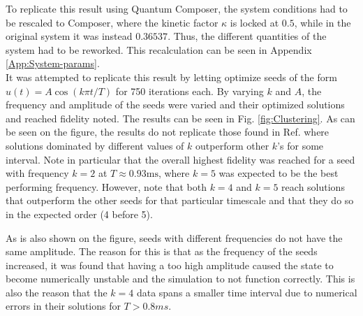 \documentclass[a4paper, twocolumn]{revtex4-1}
\begin{document}
To replicate this result using Quantum Composer, the system conditions had to be rescaled to Composer, where the kinetic factor $\kappa$ is locked at $0.5$, while in the original system it was instead $0.36537$. Thus, the different quantities of the system had to be reworked. This recalculation can be seen in Appendix \ref{App:System-params}. \\
It was attempted to replicate this result by letting  optimize seeds of the form $u(t) = A\cos(k\pi t/T)$ for 750 iterations each. By varying $k$ and $A$, the frequency and amplitude of the seeds were varied and their optimized solutions and reached fidelity noted. The results can be seen in Fig. \ref{fig:Clustering}. As can be seen on the figure, the results do not replicate those found in Ref. \cite{QM2Paper} where solutions dominated by different values of $k$ outperform other $k$'s for some interval. Note in particular that the overall highest fidelity was reached for a seed with frequency $k=2$ at $ T\approx 0.93 \text{ms} $, where $ k=5 $ was expected to be the best performing frequency. However, note that both $k=4$ and $k=5$ reach solutions that outperform the other seeds for that particular timescale and that they do so in the expected order (4 before 5). 

As is also shown on the figure, seeds with different frequencies do not have the same amplitude. The reason for this is that as the frequency of the seeds increased, it was found that having a too high amplitude caused the state to become numerically unstable and the simulation to not function correctly. This is also the reason that the $k=4$ data spans a smaller time interval due to numerical errors in their solutions for $T>0.8 ms$. \\
\end{document}
